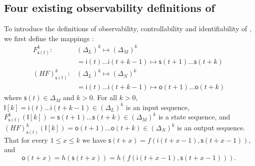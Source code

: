 %  



\subsection{Four existing observability definitions of \BCNs}
To introduce the definitions of observability, controllability and identifiability of \BCNs, we first define the mappings \cite{Zhang2016Observability}:
\begin{equation}
\begin{split}
F^k_{\mathsf{s}(t)}:& (\Delta_L)^k\mapsto(\Delta_M)^k\\
&=\mathsf{i}(t)\ldots\mathsf{i}({t+k-1}) \mapsto \mathsf{s}(t+1)\ldots\mathsf{s}(t+k)\\
(HF)^k_{\mathsf{s}(t)} :& (\Delta_L)^k\mapsto(\Delta_N)^k\\
 &=\mathsf{i}(t)\ldots\mathsf{i}(t+k-1) \mapsto \mathsf{o}(t+1)\ldots\mathsf{o}(t+k)
\end{split}
\label{equ:6}
\end{equation}
where $\mathsf{s}(t)\in \Delta_M$ and $k>0$. For all  $k>0$,
$\mathsf{I}[k]=\mathsf{i}(t)\ldots\mathsf{i}({t+k-1}) \in(\Delta_L)^k$
is an input sequence, 
$F^k_{\mathsf{s}(t)}(\mathsf{I}[k])=\mathsf{s}(t+1)\ldots\mathsf{s}(t+k) \in(\Delta_M)^k$
 is a state sequence, and 
 $(HF)^k_{\mathsf{s}(t)}(\mathsf{I}[k])=\mathsf{o}(t+1)\ldots\mathsf{o}(t+k) \in(\Delta_N)^k$
 is an output sequence. That for every $1\le x \le k$ we have 
 $\mathsf{s}(t+x)=f(\mathsf{i}(t+x-1),\mathsf{s}(t+x-1))$,
and 
 \[\mathsf{o}(t+x)=h(\mathsf{s}(t+x))=h(f(\mathsf{i}(t+x-1),\mathsf{s}(t+x-1))).\] 



